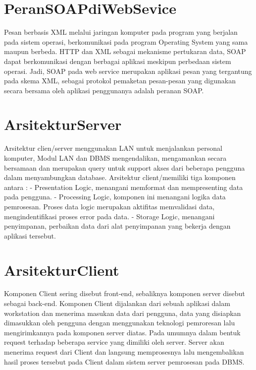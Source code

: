{\section{PeranSOAPdiWebSevice}
Pesan berbasis XML melalui jaringan komputer pada program yang berjalan pada sistem operasi, berkomunikasi pada program Operating System yang sama maupun berbeda. 
HTTP dan XML sebagai mekanisme pertukaran data, SOAP dapat berkomunikasi dengan berbagai aplikasi meskipun perbedaan sistem operasi. 
Jadi, SOAP pada web service merupakan aplikasi pesan yang tergantung pada skema XML, sebagai protokol pemaketan pesan-pesan yang digunakan secara bersama oleh aplikasi penggunanya adalah peranan SOAP.

\section{ArsitekturServer}
Arsitektur clien/server menggunakan LAN untuk menjalankan personal komputer, Modul LAN dan DBMS mengendalikan, mengamankan secara bersamaan dan merupakan query untuk support akses dari beberapa pengguna dalam menyambungkan database.
Arsitektur client/memiliki tiga komponen antara :
- Presentation Logic, menangani memformat dan mempresenting data pada pengguna.
- Processing Logic, komponen ini menangani logika data pemrosesan. Proses data logic merupakan aktifitas memvalidasi data, mengindentifikasi proses error pada data.
- Storage Logic, menangani penyimpanan, perbaikan data dari alat penyimpanan yang bekerja dengan aplikasi tersebut.

\section{ArsitekturClient}
Komponen Client sering disebut front-end, sebaliknya komponen server disebut sebagai back-end. 
Komponen Client dijalankan dari sebuah aplikasi dalam workstation dan menerima masukan data dari pengguna, data yang disiapkan dimasukkan oleh pengguna dengan menggunakan teknologi pemroresan lalu mengirimkannya pada komponen server diatas. 
Pada umumnya dalam bentuk request terhadap beberapa service yang dimiliki oleh server. 
Server akan menerima request dari Client dan langsung memprosesnya lalu mengembalikan hasil proses tersebut pada Client dalam sistem server pemrosesan pada DBMS.

}

